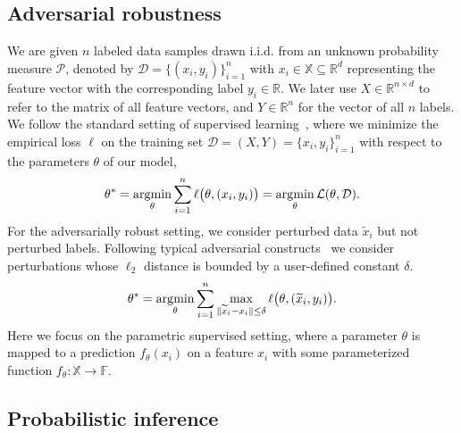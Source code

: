 \subsection{Adversarial robustness}
We are given $n$ labeled data samples drawn i.i.d. from an unknown probability measure $\mathcal{P}$, denoted by $\mathcal{D}=\{(x_i,y_i)\}_{i=1}^n$ with $x_i \in \mathbb{X} \subseteq \mathbb{R}^d$ representing the feature vector with the corresponding label $y_i \in \mathbb{R}$. We later use $X\in\mathbb{R}^{n\times d}$ to refer to the matrix of all feature vectors, and $Y \in \mathbb{R}^n$ for the vector of all $n$ labels.
We follow the standard setting of supervised learning~\citep{bishop2007pattern,deisenroth20mathml}, where we minimize the empirical loss $\ell$ on the training set $\mathcal{D} = (X,Y) = \{x_i, y_i\}_{i=1}^n$ with respect to the parameters $\theta$ of our model,
\begin{align*}
    \theta^\ast = \operatorname*{\arg\!\min}_{\theta} \sum_{i=1}^n \ell\big(\theta, (x_i, y_i) \big) =  \operatorname*{\arg\!\min}_{\theta} \mathcal{L}(\theta, \mathcal{D}).
\end{align*}
For the adversarially robust setting, we consider perturbed data $\widetilde{x}_i$ but not perturbed labels. 
Following typical adversarial constructs~\citep[for example]{szegedy2013intriguing} we consider perturbations whose $\ell_2$ distance is bounded by a user-defined constant $\delta$.
\begin{align*}
    \theta^\ast = \operatorname*{\arg\!\min}_{\theta} \sum_{i=1}^n \max\limits_{\Vert \widetilde{x}_i - x_i \Vert \leq \delta}\ell\big(\theta, (\widetilde{x}_i, y_i) \big).
\end{align*}
Here we focus on the parametric supervised setting, where a parameter $\theta$ is mapped to a prediction $f_\theta(x_i)$ on a feature $x_i$ with some parameterized function $f_\theta:\mathbb{X} \to \mathbb{F}$.




\subsection{Probabilistic inference}
